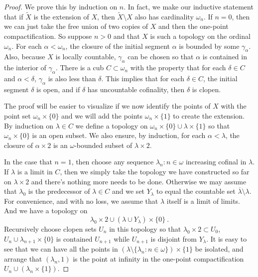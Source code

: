 \documentclass{amsart}
\theoremstyle{plain}
\theoremstyle{definition}
\theoremstyle{remark}
\theoremstyle{plain}
\theoremstyle{definition}
\theoremstyle{remark}
\begin{document}
            \begin{proof}
            We prove this by induction on $n$.
            In fact, we make our inductive statement that  if $\tilde X$
            is the extension of $X$, then  $\tilde X \setminus X$ also
            has cardinality $\omega_n$.
             If $n=0$,
              then we can just take the free union of two copies of $X$
              and then the one-point compactification.
             So suppose $n>0$ and
            that $X$ is such a topology on the ordinal $\omega_n$.
            For each $\alpha<\omega_n$, the closure of the initial
            segment $\alpha$ is bounded by some $\gamma_\alpha$.
            Also, because $X$ is locally countable, $\gamma_\alpha$
            can be chosen so that $\alpha$ is contained  in the interior
            of $\gamma_\alpha$. There is a cub  $C\subset \omega_n$
            with the property that for each $\delta\in C$ and $\alpha<\delta$,
             $\gamma_\alpha$ is also less than $\delta$. This implies
             that for each $\delta\in C$, the initial segment $\delta$ is
             open, and if $\delta$ has uncountable cofinality, then
              $\delta$ is clopen.

              The proof will be easier to visualize if we now
              identify the points of $X$ with the point set
               $\omega_n\times \{0\}$ and we will add the points
                $\omega_n\times \{1\}$ to create the extension.
             By induction on $\lambda \in C$ we define a topology
             on $\omega_n\times\{0\}\cup \lambda\times \{1\}$ so that
             $\omega_n \times \{0\}$ is an open subset. We also ensure,
             by induction, for each $\alpha<\lambda$,
             the closure of $\alpha\times 2$ is an
              $\omega$-bounded  subset of $\lambda\times 2$.

          In the case that $n=1$, then  choose any sequence
           $\lambda_n : n\in \omega$ increasing cofinal in $\lambda$.
           If $\lambda $ is a limit in $C$, then we simply take the
           topology we have constructed so far on $\lambda\times 2$
           and there's nothing more needs to be done. Otherwise
          we may assume that $\lambda_0$ is the predecessor
          of $\lambda\in C$ and
           we set $Y_\lambda $ to equal the countable set
            $\overline{\lambda}\setminus \lambda$. For convenience,
             and with no loss, we assume that $\lambda$ itself is a limit
             of limits.
           And we have a topology on
           $$\lambda_0\times 2 \cup (\lambda \cup Y_\lambda)\times\{0\}~.$$
            Recursively
            choose clopen sets $U_n$ in this topology
             so that $\lambda_0\times 2\subset U_0$,
             $U_{n}\cup \lambda_{n+1}\times \{0\}$ is contained
              $ U_{n+1}$ while $U_{n+1}$ is disjoint from $Y_\lambda$.
              It is easy to see that we can have all the points
              in $(\lambda\setminus \{\lambda_n : n\in\omega\})\times \{1\}$
              be isolated, and arrange that $(\lambda_n,1) $ is the
              point at infinity in the one-point compactification
              $U_n\cup (\lambda_n\times \{1\})$.


\end{proof}
\end{document}
